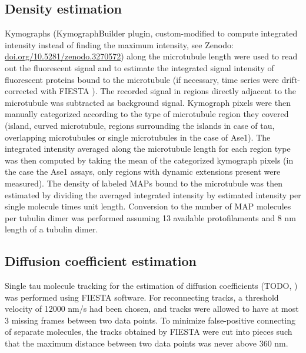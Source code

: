 \subsection{Density estimation}
Kymographs (KymographBuilder plugin, custom-modified to compute integrated intensity instead of finding the maximum intensity, see Zenodo: \url{doi.org/10.5281/zenodo.3270572}) along the microtubule length were used to read out the fluorescent signal and to estimate the integrated signal intensity of fluorescent proteins bound to the microtubule (if necessary, time series were drift-corrected with FIESTA \parencite{RUHNOW20112820}). The recorded signal in regions directly adjacent to the microtubule was subtracted as background signal. Kymograph pixels were then manually categorized according to the type of microtubule region they covered (island, curved microtubule, regions surrounding the islands in case of tau, overlapping microtubules or single microtubules in the case of Ase1). The integrated intensity averaged along the microtubule length for each region type was then computed by taking the mean of the categorized kymograph pixels (in the case the Ase1 assays, only regions with dynamic extensions present were measured). The density of labeled MAPs bound to the microtubule was then estimated by dividing the averaged integrated intensity by estimated intensity per single molecule times unit length. Conversion to the number of MAP molecules per tubulin dimer was performed assuming 13 available protofilaments and 8 nm length of a tubulin dimer.

\subsection{Diffusion coefficient estimation} 
Single tau molecule tracking for the estimation of diffusion coefficients (TODO, ) was performed using FIESTA\parencite{RUHNOW20112820} software. For reconnecting tracks, a threshold velocity of 12000 nm/s had been chosen, and tracks were allowed to have at most 3 missing frames between two data points. To minimize false-positive connecting of separate molecules, the tracks obtained by FIESTA were cut into pieces such that the maximum distance between two data points was never above 360 nm.

